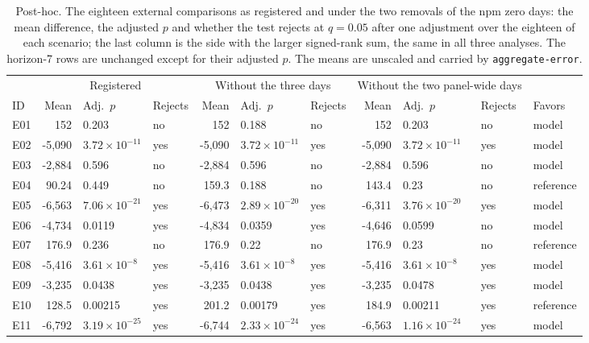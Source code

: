 \begin{table}[htbp]
\centering\footnotesize\setlength{\tabcolsep}{3.5pt}
\caption{Post-hoc. The eighteen external comparisons as registered and under the two removals of the npm
zero days: the mean difference, the adjusted $p$ and whether the test rejects at $q = 0.05$ after one
adjustment over the eighteen of each scenario; the last column is the side with the larger signed-rank sum,
the same in all three analyses. The horizon-7 rows are unchanged except for their adjusted $p$. The means
are unscaled and carried by \texttt{aggregate-error}.}
\label{tab:s2sens}
\begin{tabular}{lrllrllrlll}
\toprule
 & \multicolumn{3}{c}{Registered} & \multicolumn{3}{c}{Without the three days} & \multicolumn{3}{c}{Without the two panel-wide days} & \\
\cmidrule(lr){2-4} \cmidrule(lr){5-7} \cmidrule(lr){8-10}
ID & Mean & Adj.\ $p$ & Rejects & Mean & Adj.\ $p$ & Rejects & Mean & Adj.\ $p$ & Rejects & Favors \\
\midrule
E01 & 152 & 0.203 & no & 152 & 0.188 & no & 152 & 0.203 & no & model \\
E02 & -5,090 & $3.72 \times 10^{-11}$ & yes & -5,090 & $3.72 \times 10^{-11}$ & yes & -5,090 & $3.72 \times 10^{-11}$ & yes & model \\
E03 & -2,884 & 0.596 & no & -2,884 & 0.596 & no & -2,884 & 0.596 & no & model \\
E04 & 90.24 & 0.449 & no & 159.3 & 0.188 & no & 143.4 & 0.23 & no & reference \\
E05 & -6,563 & $7.06 \times 10^{-21}$ & yes & -6,473 & $2.89 \times 10^{-20}$ & yes & -6,311 & $3.76 \times 10^{-20}$ & yes & model \\
E06 & -4,734 & 0.0119 & yes & -4,834 & 0.0359 & yes & -4,646 & 0.0599 & no & model \\
E07 & 176.9 & 0.236 & no & 176.9 & 0.22 & no & 176.9 & 0.23 & no & reference \\
E08 & -5,416 & $3.61 \times 10^{-8}$ & yes & -5,416 & $3.61 \times 10^{-8}$ & yes & -5,416 & $3.61 \times 10^{-8}$ & yes & model \\
E09 & -3,235 & 0.0438 & yes & -3,235 & 0.0438 & yes & -3,235 & 0.0478 & yes & model \\
E10 & 128.5 & 0.00215 & yes & 201.2 & 0.00179 & yes & 184.9 & 0.00211 & yes & reference \\
E11 & -6,792 & $3.19 \times 10^{-25}$ & yes & -6,744 & $2.33 \times 10^{-24}$ & yes & -6,563 & $1.16 \times 10^{-24}$ & yes & model \\

\end{tabular}
\end{table}
